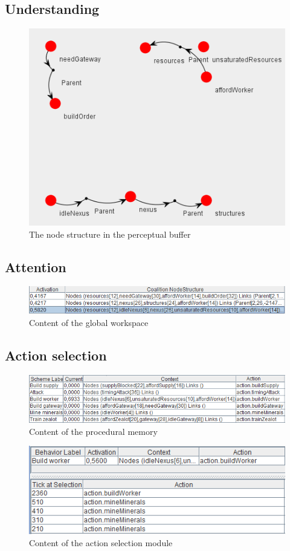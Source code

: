 \subsection{Understanding}
\begin{figure}[h!tb]
\centering
\includegraphics[scale=1.0]{graphics/perceptual_buffer.png}
\caption{The node structure in the perceptual buffer}
\label{fig:perceptbuffer}
\end{figure}

\subsection{Attention}
\begin{figure}[h!tb]
\centering
\includegraphics[scale=1.0]{graphics/global_workspace.png}
\caption{Content of the global workspace}
\label{fig:workspace}
\end{figure}

\subsection{Action selection}
\begin{figure}[h!tb]
\centering
\includegraphics[scale=1.0]{graphics/procedural_memory.png}
\caption{Content of the procedural memory}
\label{fig:proceduralmemory}
\end{figure}

\begin{figure}[h!tb]
\centering
\includegraphics[scale=1.0]{graphics/action_selection.png}
\caption{Content of the action selection module}
\label{fig:actionselection}
\end{figure}
